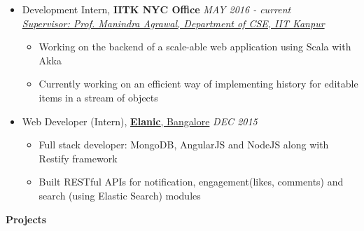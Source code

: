 \documentclass[letterpaper,11pt]{article}
\begin{document}
{\begin{itemize}
    \item Development Intern, \textbf{IITK NYC Office} \hfill \textit{MAY 2016 - current}\\
    \textit{\href{http://www.cse.iitk.ac.in/users/manindra/}{Supervisor: Prof. Manindra Agrawal, Department of CSE, IIT Kanpur}}
        \begin{itemize}
            \item Working on the backend of a scale-able web application using Scala with Akka
            \item Currently working on an efficient way of implementing history for editable items in a stream of objects
        \end{itemize}
    \item Web Developer (Intern), \href{http://elanic.in//}{\textbf{Elanic}, Bangalore} \hfill \textit{DEC 2015}
        \begin{itemize}
            \item Full stack developer: MongoDB, AngularJS and NodeJS along with Restify framework
            \item Built RESTful APIs for notification, engagement(likes, comments) and search (using Elastic Search) modules
        \end{itemize}
\end{itemize}

\Large{\textbf{Projects}}
\small

}
\end{document}
